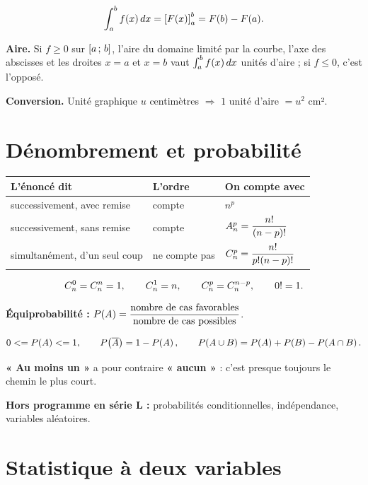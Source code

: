 \[
  \int_{a}^{b} f(x)\dx = \left[F(x)\right]_{a}^{b} = F(b)-F(a) .
\]

\textbf{Aire.} Si $f \geq 0$ sur $\intervalle{a}{b}$, l'aire du domaine
limité par la courbe, l'axe des abscisses et les droites $x = a$ et $x = b$
vaut $\int_{a}^{b} f(x)\dx$ unités d'aire ; si $f \leq 0$, c'est l'opposé.

\textbf{Conversion.} Unité graphique $u$ centimètres
$\Rightarrow$ $1$ unité d'aire $= u^{2}$ cm².

\section{Dénombrement et probabilité}

\begin{center}
\renewcommand{\arraystretch}{1.45}
\begin{tabular}{|L{4.9cm}|L{2.9cm}|L{3.4cm}|}
\hline
\textbf{L'énoncé dit} & \textbf{L'ordre} & \textbf{On compte avec}\\
\hline
successivement, avec remise & compte & $n^{p}$\\
successivement, sans remise & compte &
$\arrang{p}{n} = \dfrac{n!}{(n-p)!}$\\
simultanément, d'un seul coup & ne compte pas &
$\combi{p}{n} = \dfrac{n!}{p!(n-p)!}$\\
\hline
\end{tabular}
\end{center}

\[
  \combi{0}{n} = \combi{n}{n} = 1, \qquad \combi{1}{n} = n, \qquad
  \combi{p}{n} = \combi{n-p}{n}, \qquad 0! = 1 .
\]

\textbf{Équiprobabilité :}
$\proba{A} = \dfrac{\text{nombre de cas favorables}}
{\text{nombre de cas possibles}}$.

\[
  0 \leq \proba{A} \leq 1, \qquad \proba{\evtc{A}} = 1-\proba{A},
  \qquad \proba{A \cup B} = \proba{A}+\proba{B}-\proba{A \cap B} .
\]

\textbf{« Au moins un »} a pour contraire \textbf{« aucun »} : c'est
presque toujours le chemin le plus court.

\textbf{Hors programme en série L :} probabilités conditionnelles,
indépendance, variables aléatoires.

\section{Statistique à deux variables}

